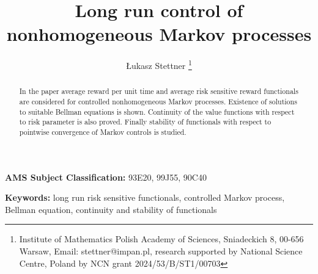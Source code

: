 \documentclass[10pt,english]{extarticle}
\begin{document}
\title{Long run control of nonhomogeneous Markov processes}

\author{{\L}ukasz Stettner  \footnote{Institute of Mathematics
 Polish Academy of Sciences,
  Sniadeckich 8, 00-656 Warsaw, Email: stettner@impan.pl,  research supported by National Science Centre, 
  Poland by NCN grant
  2024/53/B/ST1/00703}
}
\maketitle

\begin{abstract}In the paper average reward per unit time and average risk sensitive reward functionals are considered for controlled nonhomogeneous Markov processes. Existence of solutions to suitable Bellman equations is shown. Continuity of the value functions with respect to risk parameter is also proved. Finally stability of functionals with respect to pointwise convergence of Markov controls is studied. 
\end{abstract}

{{\bf AMS Subject Classification:} 93E20, 99J55, 90C40}

{{\bf Keywords:}
 long run risk sensitive functionals, controlled Markov process, Bellman equation,  continuity and stability of functionals} 

\theoremstyle{plain}
\setlength{\parskip}{12pt plus0pt minus12pt}

\newtheorem{theorem}{Theorem}
\newtheorem{lemma}[theorem]{Lemma}
\newtheorem{corollary}[theorem]{Corollary}
\newtheorem{proposition}[theorem]{Proposition}
\newtheorem{remark}{Remark}
\newtheorem{example}{Example}
\def\epr{\rightline $\box$}
\def\cF{\mathcal{F}}
\def\cT{\mathcal{T}}
\def\bF{\mathbb{F}}
\def\bP{\mathbb{P}}
\def\bE{\mathbb{E}}
\def\bR{\mathbb{R}}
\def\bT{\mathbb{T}}
\def\bN{\mathbb{N}}
\def\bV{\mathbb{V}}
\def\ef{\mathcal{F}}
\def\ee{\mathbb{E}}
\def\er{\mathbb{R}}
\def\bse{\mathcal{E}}
\def\prob{\mathbb{P}}
\def\tao{\tau_{\cal{O}}}
\def\om{{\cal{O}}_m}
\def\o{\cal{O}}
\def\taom{\tau_{{\cal{O}}_m}}
\def\taomk{\tau_{{\cal{O}}_{m_k}}}
\def\ep{\epsilon}
\def\vep{\varepsilon}
\def\se{{\cal{E}}}


\maketitle
\end{document}
